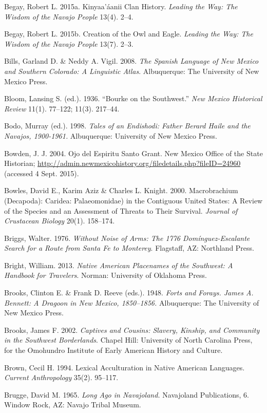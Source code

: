 \begin{hang}
	Begay, Robert L. 2015a.  Kinyaa’áanii Clan History.  \textit{Leading the Way: The Wisdom of the Navajo People} 13(4). 2--4.

	Begay, Robert L. 2015b.  Creation of the Owl and Eagle.  \textit{Leading the Way: The Wisdom of the Navajo People} 13(7). 2--3.

	Bills, Garland D. \& Neddy A. Vigil. 2008.  \textit{The Spanish Language of New Mexico and Southern Colorado: A Linguistic Atlas}.  Albuquerque:  The University of New Mexico Press.

	Bloom, Lansing S. (ed.).  1936.  “Bourke on the Southwest.”  \textit{New Mexico Historical Review} 11(1). 77--122; 11(3). 217--44.

	Bodo, Murray (ed.). 1998. \textit{ Tales of an Endishodi: Father Berard Haile and the Navajos, 1900{}-1961.}  Albuquerque:  University of New Mexico Press.

	Bowden, J. J.  2004.  Ojo del Espiritu Santo Grant.  New Mexico Office of the State Historian; \url{http://admin.newmexicohistory.org/filedetails.php?fileID=24960} (accessed 4 Sept. 2015).

	Bowles, David E., Karim Aziz \& Charles L. Knight. 2000.  Macrobrachium (Decapoda): Caridea: Palaeomonidae) in the Contiguous United States: A Review of the Species and an Assessment of Threats to Their Survival.  \textit{Journal of Crustacean Biology} 20(1). 158--174.

	Briggs, Walter. 1976.  \textit{Without Noise of Arms: The 1776 Domínguez-Escalante Search for a Route from Santa Fe to Monterey}.  Flagstaff, AZ:  Northland Press.

	Bright, William. 2013.  \textit{Native American Placenames of the Southwest: A Handbook for Travelers}.  Norman:  University of Oklahoma Press.

	Brooks, Clinton E. \& Frank D. Reeve (eds.). 1948.  \textit{Forts and Forays. James A. Bennett: A Dragoon in New Mexico, 1850--1856.}  Albuquerque:  The University of New Mexico Press.

	Brooks, James F.  2002.  \textit{Captives and Cousins: Slavery, Kinship, and Community in the Southwest Borderlands}.  Chapel Hill:  University of North Carolina Press, for the Omohundro Institute of Early American History and Culture.

	Brown, Cecil H.  1994.  Lexical Acculturation in Native American Languages.  \textit{Current Anthropology} 35(2). 95--117.

	Brugge, David M.  1965.  \textit{Long Ago in Navajoland.}  Navajoland Publications, 6.  Window Rock, AZ: Navajo Tribal Museum.


\end{hang}
